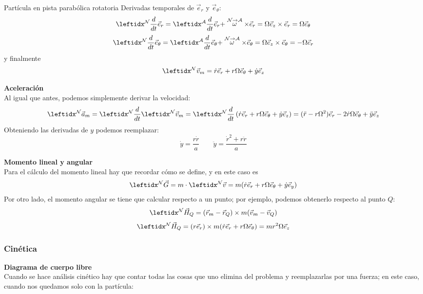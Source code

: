 \begin{solucion}{Partícula en pista parabólica rotatoria}
Derivadas temporales de $\vec{e}_r$ y $\vec{e}_\theta$:
$$\transport{\vec{e}_r}{N}{A}=\Omega\vec{e}_z\times\vec{e}_r=\Omega\vec{e}_\theta$$
$$\transport{\vec{e}_\theta}{N}{A}=\Omega\vec{e}_z\times\vec{e}_\theta=-\Omega\vec{e}_r$$
y finalmente
$$\marc{\vec{v}_m}{N}=\dot r\vec{e}_r+r\Omega\vec{e}_\theta+\dot y\vec{e}_z$$

\textbf{Aceleración}\\
Al igual que antes, podemos simplemente derivar la velocidad:
$$\marc{\vec{a}_m}{N}=\der{\marc{\vec{v}_m}{N}{}}{N}{}=\der{\left(\dot r\vec{e}_r+r\Omega\vec{e}_\theta+\dot y\vec{e}_z\right)}{N}{}=(\ddot{r}-r\Omega^2)\vec{e}_r-2\dot r\Omega\vec{e}_{\theta}+\ddot{y}\vec{e}_z$$
Obteniendo las derivadas de $y$ podemos reemplazar:
$$\dot y=\dfrac{r\dot r}{a}\qquad\ddot y=\dfrac{\dot r^2+r\ddot r}{a}$$

\textbf{Momento lineal y angular}\\
Para el cálculo del momento lineal hay que recordar cómo se define, y en este caso es
$$\marc{}{N}\vec{G}=m\cdot \marc{\vec{v}}{N}=m(\dot r\vec{e}_r+r\Omega\vec{e}_\theta+\dot y\vec{e}_y)$$
Por otro lado, el momento angular se tiene que calcular respecto a un punto; por ejemplo, podemos obtenerlo respecto al punto $Q$:
$$\marc{}{N}\vec{H}_Q=(\vec{r}_m-\vec{r}_Q)\times m(\vec{v}_m-\vec{v}_Q)$$
$$\marc{}{N}\vec{H}_Q=(r\vec{e}_r)\times m(\dot r\vec{e}_r+r\Omega\vec{e}_\theta)=mr^2\Omega\vec{e}_z$$

\subsubsection*{Cinética}
\textbf{Diagrama de cuerpo libre}\\
Cuando se hace análisis cinético hay que contar todas las cosas que uno elimina del problema y reemplazarlas por una fuerza; en este caso, cuando nos quedamos solo con la partícula:

\begin{center}
\end{center}
\end{solucion}
